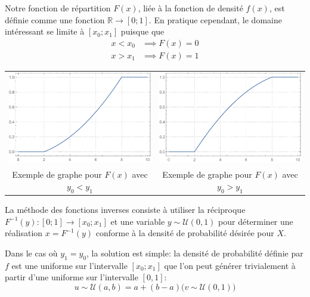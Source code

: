 \documentclass[a4paper,11pt]{report}
\begin{document}
Notre fonction de répartition $F(x)$, liée à la fonction de densité $f(x)$, est définie comme une fonction $\mathbb{R} \rightarrow [0;1]$. En pratique cependant, le domaine intéressant se limite à $[x_0;x_1]$ puisque que
\begin{align*}
	x < x_0 &\implies F(x) = 0 \\
	x > x_1 &\implies F(x) = 1
\end{align*}

\begin{center}
	\begin{tabular}{cc}
		\includegraphics[width=7cm]{img_graph2} & \includegraphics[width=7cm]{img_graph1} \\
		{\footnotesize Exemple de graphe pour $F(x)$ avec $y_0 < y_1$} & {\footnotesize Exemple de graphe pour $F(x)$ avec $y_0 > y_1$}
	\end{tabular}
\end{center}

La méthode des fonctions inverses consiste à utiliser la réciproque  $F^{-1}(y) : [0;1] \rightarrow [x_0;x_1]$ et une variable $y \sim \mathcal{U}(0, 1)$ pour déterminer une réalisation $x = F^{-1}(y)$ conforme à la densité de probabilité désirée pour $X$.

Dans le cas où $y_1 = y_0$, la solution est simple: la densité de probabilité définie par $f$ est une uniforme sur l'intervalle $[x_0;x_1]$ que l'on peut générer trivialement à partir d'une uniforme sur l'intervalle $[0,1]$:
\begin{equation*}
u \sim \mathcal{U}(a,b) = a + (b - a) \big( v \sim \mathcal{U}(0, 1) \big)
\end{equation*}
\end{document}
